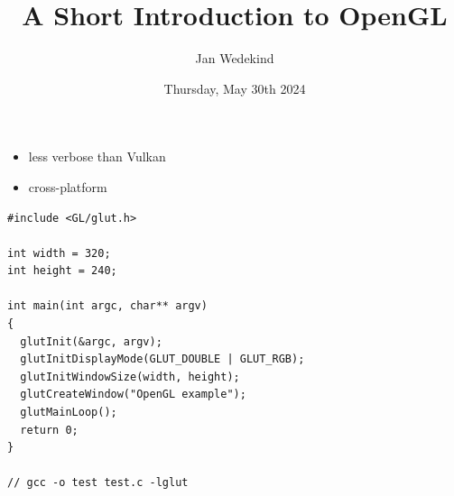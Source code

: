\documentclass[calcdimensions,landscape,letterpaper]{powersem}
\title{A Short Introduction to OpenGL}
\author{Jan Wedekind}
\date{Thursday, May 30th 2024}
\newcommand{\thecurrentheading}{}
\newcommand{\heading}[1]{\renewcommand{\thecurrentheading}{#1}}
\begin{document}
\begin{slide}
  \heading{\ }
  \begin{center}
    \maketitle
  \end{center}
\end{slide}

\begin{slide}
  \heading{Motivation}
  \begin{center}
    \begin{minipage}[c]{.5\textwidth}
      \begin{itemize}
          \item less verbose than Vulkan
          \item cross-platform
      \end{itemize}
    \end{minipage}
  \end{center}
\end{slide}

\begin{slide}
    \heading{GLFW Window}
    \begin{center}
        \begin{minipage}[c]{.6\textwidth}
            \begin{verbatim}
#include <GL/glut.h>

int width = 320;
int height = 240;

int main(int argc, char** argv)
{
  glutInit(&argc, argv);
  glutInitDisplayMode(GLUT_DOUBLE | GLUT_RGB);
  glutInitWindowSize(width, height);
  glutCreateWindow("OpenGL example");
  glutMainLoop();
  return 0;
}

// gcc -o test test.c -lglut
            \end{verbatim}
        \end{minipage}
    \end{center}
\end{slide}
\end{document}
